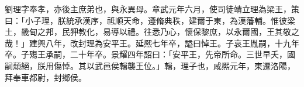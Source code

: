 \begin{pinyinscope}
 
 
 劉理字奉孝，亦後主庶弟也，與永異母。章武元年六月，使司徒靖立理為梁王，策曰：「小子理，朕統承漢序，祗順天命，遵脩典秩，建爾于東，為漢藩輔。惟彼梁土，畿甸之邦，民狎教化，易導以禮。往悉乃心，懷保黎庶，以永爾國，王其敬之哉！」建興八年，改封理為安平王。延熈七年卒，謚曰悼王。子哀王胤嗣，十九年卒。子殤王承嗣，二十年卒。景耀四年詔曰：「安平王，先帝所命。三世早夭，國嗣頹絕，朕用傷悼。其以武邑侯輯襲王位。」輯，理子也，咸熈元年，東遷洛陽，拜奉車都尉，封鄉侯。
 
 
\end{pinyinscope}